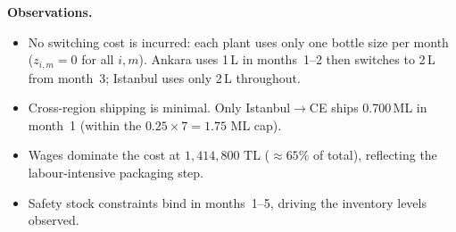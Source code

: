 \documentclass[12pt,a4paper]{article}
\begin{document}
\medskip
\textbf{Observations.}
\begin{itemize}
  \item No switching cost is incurred: each plant uses only one bottle size per month
        ($z_{i,m}=0$ for all $i,m$). Ankara uses 1\,L in months~1--2 then switches to 2\,L
        from month~3; Istanbul uses only 2\,L throughout.
  \item Cross-region shipping is minimal. Only Istanbul$\to$CE ships 0.700\,ML in month~1
        (within the $0.25\times7=1.75$ ML cap).
  \item Wages dominate the cost at $1{,}414{,}800$ TL ($\approx65\%$ of total), reflecting
        the labour-intensive packaging step.
  \item Safety stock constraints bind in months~1--5, driving the inventory levels observed.
\end{itemize}
\end{document}
